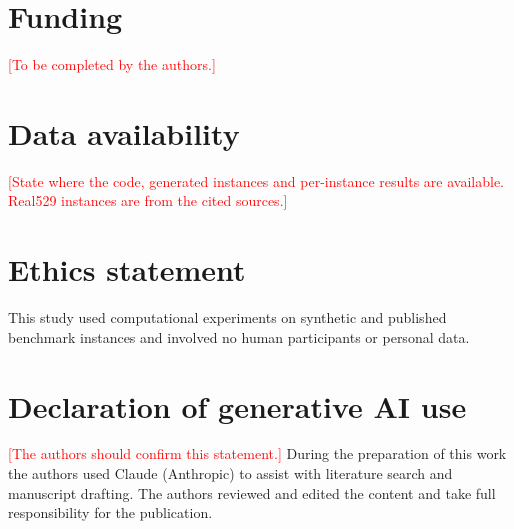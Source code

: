 \documentclass[preprint,12pt,authoryear]{elsarticle}
\newcommand{\placeholder}[1]{\textcolor{red}{[#1]}}
\begin{document}
\section*{Funding}
\placeholder{To be completed by the authors.}

\section*{Data availability}
\placeholder{State where the code, generated instances and per-instance results are available. Real529 instances are from the cited sources.}

\section*{Ethics statement}
This study used computational experiments on synthetic and published benchmark instances and involved no human participants or personal data.

\section*{Declaration of generative AI use}
\placeholder{The authors should confirm this statement.} During the preparation of this work the authors used Claude (Anthropic) to assist with literature search and manuscript drafting. The authors reviewed and edited the content and take full responsibility for the publication.



\end{document}
